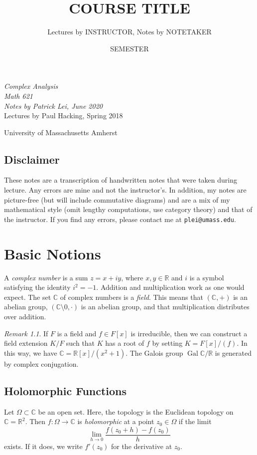 \documentclass[leqno, openany]{memoir}
\title{COURSE TITLE}
\author{Lectures by INSTRUCTOR, Notes by NOTETAKER}
\date{SEMESTER}
\theoremstyle{definition}
\theoremstyle{remark}
\newtheorem{rmk}[thm]{Remark}
\theoremstyle{plain}
\theoremstyle{definition}
\theoremstyle{remark}
\newcommand{\R}{\mathbb{R}}
\newcommand{\C}{\mathbb{C}}
\newcommand*{\titleSW}
    {\begingroup%
    \raggedleft
    \vspace*{\baselineskip}
    {\Huge\itshape Complex Analysis \\ Math 621}\\[\baselineskip]
    {\large\itshape Notes by Patrick Lei,
                    June 2020}\\[0.2\textheight]
    {\Large Lectures by Paul Hacking, Spring 2018}\par
    \vfill
    {\Large \sffamily University of Massachusetts Amherst}
    \vspace*{\baselineskip}
\endgroup}
\begin{document}
    
\begin{titlingpage}
\titleSW
\end{titlingpage}

\thispagestyle{empty}
\section*{Disclaimer}%
\label{sec:disclaimer}

These notes are a transcription of handwritten notes that were taken during lecture. 
Any errors are mine and not the instructor's. 
In addition, my notes are picture-free (but will include commutative diagrams) and are a mix of my mathematical style 
(omit lengthy computations, use category theory) and that of the instructor.
If you find any errors, please contact me at \texttt{plei@umass.edu}.
\newpage

\tableofcontents

\chapter{Basic Notions}%
\label{cha:basic_notions}

A \textit{complex number} is a sum $z = x + iy$, where $x,y \in \R$ and $i$ is a symbol satisfying the identity $i^2 = -1$. Addition and multiplication work as one would expect. The set $\C$ of complex numbers is a \textit{field}. This means that $(\C,+)$ is an abelian group, $(\C \setminus \qty{0}, \cdot)$ is an abelian group, and that multiplication distributes over addition.

\begin{rmk}
    If $F$ is a field and $f \in F[x]$ is irreducible, then we can construct a field extension $K/F$ such that $K$ has a root of $f$ by setting $K = F[x]/(f)$. In this way, we have $\C = \R[x] / (x^2 + 1)$. The Galois group $\operatorname{Gal} \C/\R$ is generated by complex conjugation.
\end{rmk}

\section{Holomorphic Functions}%
\label{sec:holomorphic_functions}

Let $\Omega \subset \C$ be an open set. Here, the topology is the Euclidean topology on $\C = \R^2$. Then $f: \Omega \to \C$ is \textit{holomorphic} at a point $z_0 \in \Omega$ if the limit
\[ \lim_{h \to 0} \frac{f(z_0+h) - f(z_0)}{h} \]
exists. If it does, we write $f'(z_0)$ for the derivative at $z_0$.
\end{document}
